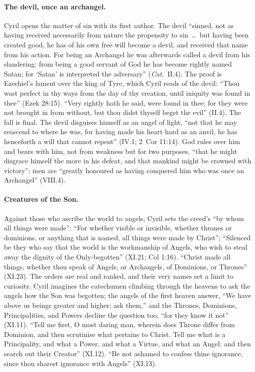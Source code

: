 \paragraph{The devil, once an archangel.} Cyril opens the matter of sin
with its first author. The devil ``sinned, not as having received
necessarily from nature the propensity to sin~\dots\ but having been
created good, he has of his own free will become a devil, and received
that name from his action. For being an Archangel he was afterwards
called a devil from his slandering: from being a good servant of God he
has become rightly named Satan; for `Satan' is interpreted the
adversary'' (\emph{Cat.}\ II.4). The proof is Ezechiel's lament over the
king of Tyre, which Cyril reads of the devil: ``Thou wast perfect in thy
ways from the day of thy creation, until iniquity was found in thee''
(Ezek 28:15). ``Very rightly hath he said, were found in thee; for they
were not brought in from without, but thou didst thyself beget the
evil'' (II.4). The fall is final. The devil disguises himself as an
angel of light, ``not that he may reascend to where he was, for having
made his heart hard as an anvil, he has henceforth a will that cannot
repent'' (IV.1; 2~Cor 11:14). God rules over him and bears with him, not
from weakness but for two purposes, ``that he might disgrace himself the
more in his defeat, and that mankind might be crowned with victory'';
men are ``greatly honoured as having conquered him who was once an
Archangel'' (VIII.4).

\paragraph{Creatures of the Son.} Against those who ascribe the world to
angels, Cyril sets the creed's ``by whom all things were made'': ``For
whether visible or invisible, whether thrones or dominions, or anything
that is named, all things were made by Christ''; ``Silenced be they who
say that the world is the workmanship of Angels, who wish to steal away
the dignity of the Only-begotten'' (XI.21; Col 1:16). ``Christ made all
things, whether thou speak of Angels, or Archangels, of Dominions, or
Thrones'' (XI.23). The orders are real and ranked, and their very names
set a limit to curiosity. Cyril imagines the catechumen climbing through
the heavens to ask the angels how the Son was begotten; the angels of
the first heaven answer, ``We have above us beings greater and higher;
ask them,'' and the Thrones, Dominions, Principalities, and Powers
decline the question too, ``for they know it not'' (XI.11). ``Tell me
first, O most daring man, wherein does Throne differ from Dominion, and
then scrutinise what pertains to Christ. Tell me what is a Principality,
and what a Power, and what a Virtue, and what an Angel: and then search
out their Creator'' (XI.12). ``Be not ashamed to confess thine
ignorance, since thou sharest ignorance with Angels'' (XI.13).

